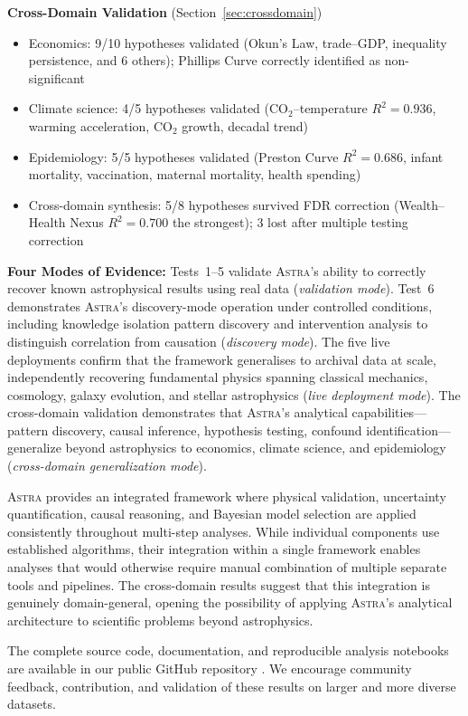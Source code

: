 \documentclass[fleqn,usenatbib]{mnras}
\newcommand{\astra}{\textsc{Astra}\xspace}
\begin{document}
\textbf{Cross-Domain Validation} (Section~\ref{sec:crossdomain})
\begin{itemize}
  \item Economics: 9/10 hypotheses validated (Okun's Law, trade--GDP, inequality persistence, and 6 others); Phillips Curve correctly identified as non-significant
  \item Climate science: 4/5 hypotheses validated (CO$_{2}$--temperature $R^{2}=0.936$, warming acceleration, CO$_{2}$ growth, decadal trend)
  \item Epidemiology: 5/5 hypotheses validated (Preston Curve $R^{2}=0.686$, infant mortality, vaccination, maternal mortality, health spending)
  \item Cross-domain synthesis: 5/8 hypotheses survived FDR correction (Wealth--Health Nexus $R^{2}=0.700$ the strongest); 3 lost after multiple testing correction
\end{itemize}

\textbf{Four Modes of Evidence:}
Tests~1--5 validate \astra's ability to correctly recover known astrophysical results using real data (\emph{validation mode}).
Test~6 demonstrates \astra's discovery-mode operation under controlled conditions, including knowledge isolation pattern discovery and intervention analysis to distinguish correlation from causation (\emph{discovery mode}).
The five live deployments confirm that the framework generalises to archival data at scale, independently recovering fundamental physics spanning classical mechanics, cosmology, galaxy evolution, and stellar astrophysics (\emph{live deployment mode}).
The cross-domain validation demonstrates that \astra's analytical capabilities---pattern discovery, causal inference, hypothesis testing, confound identification---generalize beyond astrophysics to economics, climate science, and epidemiology (\emph{cross-domain generalization mode}).

\astra provides an integrated framework where physical validation, uncertainty quantification, causal reasoning, and Bayesian model selection are applied consistently throughout multi-step analyses.
While individual components use established algorithms, their integration within a single framework enables analyses that would otherwise require manual combination of multiple separate tools and pipelines.
The cross-domain results suggest that this integration is genuinely domain-general, opening the possibility of applying \astra's analytical architecture to scientific problems beyond astrophysics.

The complete source code, documentation, and reproducible analysis notebooks are available in our public GitHub repository \citep{WhiteDey2026}.
We encourage community feedback, contribution, and validation of these results on larger and more diverse datasets.
\end{document}
